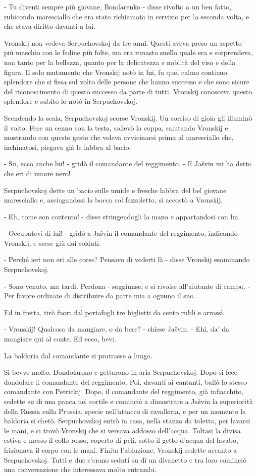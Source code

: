 - Tu diventi sempre più giovane, Bondarenko - disse rivolto a un ben fatto, rubicondo maresciallo che era stato richiamato in servizio per la seconda volta, e che stava diritto davanti a lui. 

Vronskij non vedeva Serpuchovskoj da tre anni. Questi aveva preso un aspetto più maschio con le fedine più folte, ma era rimasto snello quale era e sorprendeva, non tanto per la bellezza, quanto per la delicatezza e nobiltà del viso e della figura. Il solo mutamento che Vronskij notò in lui, fu quel calmo continuo splendore che si fissa sul volto delle persone che hanno successo e che sono sicure del riconoscimento di questo successo da parte di tutti. Vronskij conosceva questo splendore e subito lo notò in Serpuchovskoj. 

Scendendo la scala, Serpuchovskoj scorse Vronskij. Un sorriso di gioia gli illuminò il volto. Fece un cenno con la testa, sollevò la coppa, salutando Vronskij e mostrando con questo gesto che voleva avvicinarsi prima al maresciallo che, inchinatosi, piegava già le labbra al bacio. 

- Su, ecco anche lui! - gridò il comandante del reggimento. - E Jašvin mi ha detto che eri di umore nero! 

Serpuchovskoj dette un bacio sulle umide e fresche labbra del bel giovane maresciallo e, asciugandosi la bocca col fazzoletto, si accostò a Vronskij. 

- Eh, come son contento! - disse stringendogli la mano e appartandosi con lui. 

- Occupatevi di lui! - gridò a Jašvin il comandante del reggimento, indicando Vronskij, e scese giù dai soldati. 

- Perché ieri non eri alle corse? Pensavo di vederti là - disse Vronskij esaminando Serpuchovskoj. 

- Sono venuto, ma tardi. Perdona - soggiunse, e si rivolse all'aiutante di campo. - Per favore ordinate di distribuire da parte mia a ognuno il suo. 

Ed in fretta, tirò fuori dal portafogli tre biglietti da cento rubli e arrossì. 

- Vronskij! Qualcosa da mangiare, o da bere? - chiese Jašvin. - Ehi, da' da mangiare qui al conte. Ed ecco, bevi. 

La baldoria dal comandante si protrasse a lungo. 

Si bevve molto. Dondolarono e gettarono in aria Serpuchovskoj. Dopo si fece dondolare il comandante del reggimento. Poi, davanti ai cantanti, ballò lo stesso comandante con Petrickij. Dopo, il comandante del reggimento, già infiacchito, sedette su di una panca nel cortile e cominciò a dimostrare a Jašvin la superiorità della Russia sulla Prussia, specie nell'attacco di cavalleria, e per un momento la baldoria si chetò. Serpuchovskoj entrò in casa, nella stanza da toletta, per lavarsi le mani, e ci trovò Vronskij che si versava addosso dell'acqua. Toltasi la divisa estiva e messo il collo rosso, coperto di peli, sotto il getto d'acqua del lavabo, frizionava il corpo con le mani. Finita l'abluzione, Vronskij sedette accanto a Serpuchovskoj. Tutti e due s'erano seduti su di un divanetto e tra loro cominciò una conversazione che interessava molto entrambi. 

